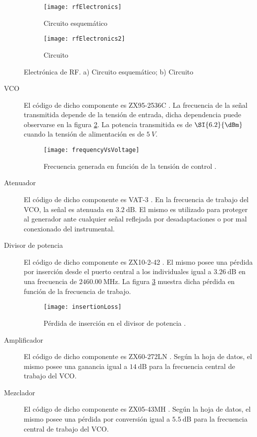 \begin{figure}[htb]
  \centering
  \begin{subfigure}{\textwidth}
    \centering
    \texttt{[image: rfElectronics]}
    \caption{Circuito esquemático}
  \end{subfigure}

  \begin{subfigure}{\textwidth}
    \centering
    \texttt{[image: rfElectronics2]}
    \caption{Circuito}
  \end{subfigure}
  \caption{Electrónica de RF. a) Circuito esquemático; b) Circuito}
  \label{fig:rfElectronics}
\end{figure}

\begin{description}
  \item[VCO] El código de dicho componente es ZX95-2536C \cite{VCOMiniCircuits}. La frecuencia de la señal transmitida depende de la tensión de entrada, dicha dependencia puede observarse en la figura \ref{fig:freqVsVoltage}. La potencia transmitida es de $\SI{6.2}{\dBm}$ cuando la tensión de alimentación es de $\SI{5}{V}$. 
  \begin{figure}[H]
   \centering
   \texttt{[image: frequencyVsVoltage]}
   \caption{Frecuencia generada en función de la tensión de control \cite{VCOMiniCircuits}.}
   \label{fig:freqVsVoltage}
  \end{figure}
  
  \item[Atenuador] El código de dicho componente es VAT-3 \cite{AttMiniCircuits}. En la frecuencia de trabajo del VCO, la señal es atenuada en $\SI{3.2}{\deci\bel}$. El mismo es utilizado para proteger al generador ante cualquier señal reflejada por desadaptaciones o por mal conexionado del instrumental.

  \item[Divisor de potencia] El código de dicho componente es ZX10-2-42 \cite{PSCMiniCircuits}. El mismo posee una pérdida por inserción desde el puerto central a los individuales igual a $\SI{3.26}{\dB}$ en una frecuencia de $\SI{2460.00}{\MHz}$. La figura \ref{fig:insertionLoss} muestra dicha pérdida en función de la frecuencia de trabajo.

  \begin{figure}[H]
   \centering
   \texttt{[image: insertionLoss]}
   \caption{Pérdida de inserción en el divisor de potencia \cite{PSCMiniCircuits}.}
   \label{fig:insertionLoss}
  \end{figure}

  \item[Amplificador] El código de dicho componente es ZX60-272LN \cite{LNAMiniCircuits}. Según la hoja de datos, el mismo posee una ganancia igual a $\SI{14}{\deci\bel}$ para la frecuencia central de trabajo del VCO.

  \item[Mezclador] El código de dicho componente es ZX05-43MH \cite{mixerMiniCircuits}. Según la hoja de datos, el mismo posee una pérdida por conversión igual a $\SI{5.5}{\deci\bel}$ para la frecuencia central de trabajo del VCO.

\end{description}


